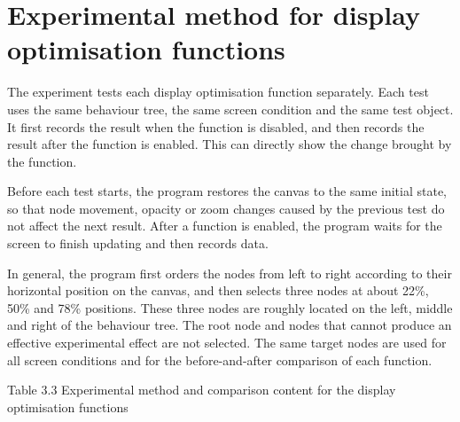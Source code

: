\documentclass[11pt,a4paper,oneside,extrafontsizes]{memoir}
\begin{document}
\section{Experimental method for display optimisation functions}

The experiment tests each display optimisation function separately. Each test uses the same behaviour tree, the same screen condition and the same test object. It first records the result when the function is disabled, and then records the result after the function is enabled. This can directly show the change brought by the function.

Before each test starts, the program restores the canvas to the same initial state, so that node movement, opacity or zoom changes caused by the previous test do not affect the next result. After a function is enabled, the program waits for the screen to finish updating and then records data.

In general, the program first orders the nodes from left to right according to their horizontal position on the canvas, and then selects three nodes at about 22\%, 50\% and 78\% positions. These three nodes are roughly located on the left, middle and right of the behaviour tree. The root node and nodes that cannot produce an effective experimental effect are not selected. The same target nodes are used for all screen conditions and for the before-and-after comparison of each function.

Table 3.3 Experimental method and comparison content for the display optimisation functions
\end{document}
